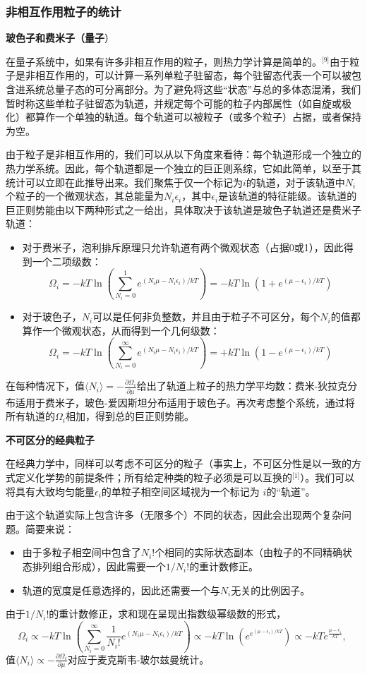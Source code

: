\subsubsection{非相互作用粒子的统计}

\textbf{玻色子和费米子（量子}）

在量子系统中，如果有许多非相互作用的粒子，则热力学计算是简单的。\(^\text{[9]}\)由于粒子是非相互作用的，可以计算一系列单粒子驻留态，每个驻留态代表一个可以被包含进系统总量子态的可分离部分。为了避免将这些“状态”与总的多体态混淆，我们暂时称这些单粒子驻留态为轨道，并规定每个可能的粒子内部属性（如自旋或极化）都算作一个单独的轨道。每个轨道可以被粒子（或多个粒子）占据，或者保持为空。

由于粒子是非相互作用的，我们可以从以下角度来看待：每个轨道形成一个独立的热力学系统。因此，每个轨道都是一个独立的巨正则系综，它如此简单，以至于其统计可以立即在此推导出来。我们聚焦于仅一个标记为\(i\)的轨道，对于该轨道中\(N_i\)个粒子的一个微观状态，其总能量为\(N_i\epsilon_i\)，其中\(\epsilon_i\)是该轨道的特征能级。该轨道的巨正则势能由以下两种形式之一给出，具体取决于该轨道是玻色子轨道还是费米子轨道：

\begin{itemize}
\item 对于费米子，泡利排斥原理只允许轨道有两个微观状态（占据0或1），因此得到一个二项级数：
\[
\Omega_i = -kT \ln \left( \sum_{N_i=0}^{1} e^{(N_i \mu - N_i \epsilon_i)/kT} \right) = -kT \ln \left( 1 + e^{(\mu - \epsilon_i)/kT} \right)~
\]
\item 对于玻色子，\(N_i\)可以是任何非负整数，并且由于粒子不可区分，每个\(N_i\)的值都算作一个微观状态，从而得到一个几何级数：
\[
\Omega_i = -kT \ln \left( \sum_{N_i=0}^{\infty} e^{(N_i \mu - N_i \epsilon_i)/kT} \right) = +kT \ln \left( 1 - e^{(\mu - \epsilon_i)/kT} \right)~
\]
\end{itemize}
在每种情况下，值\(\langle N_i \rangle = -\frac{\partial \Omega_i}{\partial \mu}\)给出了轨道上粒子的热力学平均数：费米-狄拉克分布适用于费米子，玻色-爱因斯坦分布适用于玻色子。再次考虑整个系统，通过将所有轨道的\(\Omega_i\)相加，得到总的巨正则势能。

\textbf{不可区分的经典粒子}

在经典力学中，同样可以考虑不可区分的粒子（事实上，不可区分性是以一致的方式定义化学势的前提条件；所有给定种类的粒子必须是可以互换的\(^\text{[1]}\)）。我们可以将具有大致均匀能量\(\epsilon_i\)的单粒子相空间区域视为一个标记为 \(i\)的“轨道”。

由于这个轨道实际上包含许多（无限多个）不同的状态，因此会出现两个复杂问题。简要来说：
\begin{itemize}
\item 由于多粒子相空间中包含了\(N_i!\)个相同的实际状态副本（由粒子的不同精确状态排列组合形成），因此需要一个\(1/N_i!\)的重计数修正。
\item 轨道的宽度是任意选择的，因此还需要一个与\(N_i\)无关的比例因子。
\end{itemize}
由于\(1/N_i!\)的重计数修正，求和现在呈现出指数级幂级数的形式，
\[
\Omega_i \propto -kT \ln \left( \sum_{N_i=0}^{\infty} \frac{1}{N_i!} e^{(N_i \mu - N_i \epsilon_i)/kT} \right)
\propto -kT \ln \left( e^{e^{(\mu - \epsilon_i)/kT}} \right)
\propto -kT e^{\frac{\mu - \epsilon_i}{kT}},~
\]
值\(\langle N_i \rangle \propto -\frac{\partial \Omega_i}{\partial \mu}\)对应于麦克斯韦-玻尔兹曼统计。
